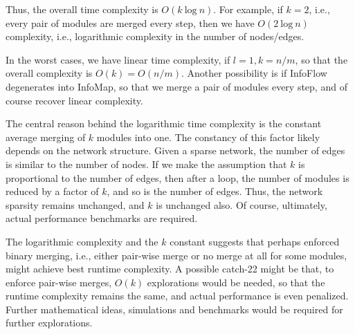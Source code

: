 \documentclass[12pt,a4paper]{article}
\begin{document}
Thus, the overall time complexity is \(O(k~\mathrm{log}~n)\). For example, if \(k=2\), i.e., every pair of modules are merged every step, then we have \(O(2~\mathrm{log}~n)\) complexity, i.e., logarithmic complexity in the number of nodes/edges.

In the worst cases, we have linear time complexity, if \(l=1, k=n/m\), so that the overall complexity is \(O(k) = O(n/m)\). Another possibility is if InfoFlow degenerates into InfoMap, so that we merge a pair of modules every step, and of course recover linear complexity.

The central reason behind the logarithmic time complexity is the constant average merging of \(k\) modules into one. The constancy of this factor likely depends on the network structure. Given a sparse network, the number of edges is similar to the number of nodes. If we make the assumption that \(k\) is proportional to the number of edges, then after a loop, the number of modules is reduced by a factor of \(k\), and so is the number of edges. Thus, the network sparsity remains unchanged, and \(k\) is unchanged also. Of course, ultimately, actual performance benchmarks are required.

The logarithmic complexity and the \(k\) constant suggests that perhaps enforced binary merging, i.e., either pair-wise merge or no merge at all for some modules, might achieve best runtime complexity. A possible catch-22 might be that, to enforce pair-wise merges, \(O(k)\) explorations would be needed, so that the runtime complexity remains the same, and actual performance is even penalized. Further mathematical ideas, simulations and benchmarks would be required for further explorations.
\end{document}

